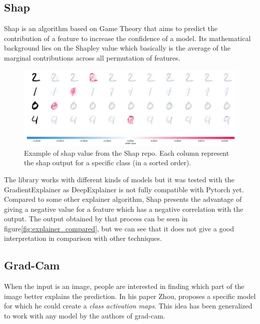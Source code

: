 \subsection{Shap}
Shap is an algorithm based on Game Theory that aims to predict the contribution of a feature to increase the confidence of a model. Its mathematical background lies on the Shapley value which basically is the average of the marginal contributions across all permutation of features.

\begin{figure}
 \centering
 \includegraphics[width=.9\linewidth]{figures/shap_mnist_image_plot.png}
 \captionsetup{width=.9\linewidth}
 \caption[ShapExample]{Example of shap value from the Shap repo\footnotemark{}. Each column represent the shap output for a specific class (in a sorted order).}
 \label{fig:shap_example}
\end{figure}

The library\cite{shap_lundberg2017unified} works with different kinds of models but it was tested with the GradientExplainer as DeepExplainer is not fully compatible with Pytorch yet. Compared to some other explainer algorithm, Shap presents the advantage of giving a negative value for a feature which has a negative correlation with the output. The output obtained by that process can be seen in figure\ref{fig:explainer_compared}, but we can see that it does not give a good interpretation in comparison with other techniques.



\subsection{Grad-Cam}
When the input is an image, people are interested in finding which part of the image better explains the prediction. In his paper\cite{zhou2015cnnlocalization} Zhou, proposes a specific model for which he could create a \textit{class activation maps}. This idea has been generalized to work with any model by the authors of grad-cam. 

